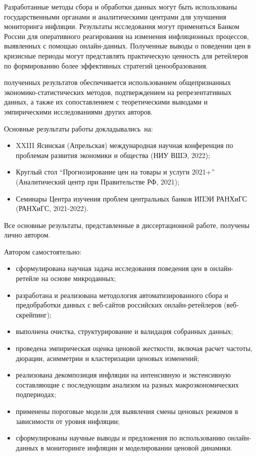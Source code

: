 {\practicalInfluence} Разработанные методы сбора и обработки данных могут быть использованы государственными органами и аналитическими центрами для улучшения мониторинга инфляции. Результаты исследования могут применяться Банком России для оперативного реагирования на изменения инфляционных процессов, выявленных с помощью онлайн-данных. Полученные выводы о поведении цен в кризисные периоды могут представлять практическую ценность для ретейлеров по формированию более эффективных стратегий ценообразования.


{\reliability} полученных результатов обеспечивается использованием общепризнанных экономико-статистических методов, подтверждением на репрезентативных данных, а также их сопоставлением с теоретическими выводами и эмпирическими исследованиями других авторов.


{\probation}
Основные результаты работы докладывались~на:
\begin{itemize}
	\item XXIII Ясинская (Апрельская) международная научная конференция по проблемам развития экономики и общества (НИУ ВШЭ, 2022);
	\item Круглый стол \enquote{Прогнозирование цен на товары и услуги 2021+} (Аналитический центр при Правительстве РФ, 2021);
	\item Семинары Центра изучения проблем центральных банков ИПЭИ \mbox{РАНХиГС} (РАНХиГС, 2021-2022).
\end{itemize}

{\contribution}
Все основные результаты, представленные в диссертационной работе, получены лично автором.

Автором самостоятельно:
\begin{itemize}
	\item сформулирована научная задача исследования поведения цен в онлайн-ретейле на основе микроданных;
	\item разработана и реализована методология автоматизированного сбора и предобработки данных с веб-сайтов российских онлайн-ретейлеров (веб-скрейпинг);
	\item выполнена очистка, структурирование и валидация собранных данных;
	\item проведена эмпирическая оценка ценовой жесткости, включая расчет частоты, дюрации, асимметрии и кластеризации ценовых изменений;
	\item реализована декомпозиция инфляции на интенсивную и экстенсивную составляющие с последующим анализом на разных макроэкономических подпериодах;
	\item применены пороговые модели для выявления смены ценовых режимов в зависимости от уровня инфляции;
	\item сформулированы научные выводы и предложения по использованию онлайн-данных в мониторинге инфляции и моделировании ценовой динамики.
\end{itemize}

